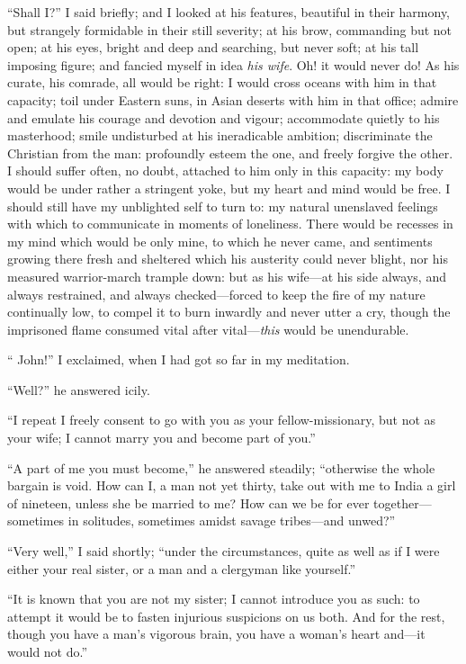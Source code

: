 \enquote{Shall I?} I said briefly; and I looked at his features,
beautiful in their harmony, but strangely formidable in their still
severity; at his brow, commanding but not open; at his eyes, bright and
deep and searching, but never soft; at his tall imposing figure; and
fancied myself in idea \emph{his wife}. Oh! it would never do! As his
curate, his comrade, all would be right: I would cross oceans with him
in that capacity; toil under Eastern suns, in Asian deserts with him in
that office; admire and emulate his courage and devotion and vigour;
accommodate quietly to his masterhood; smile undisturbed at his
ineradicable ambition; discriminate the Christian from the man:
profoundly esteem the one, and freely forgive the other. I should
suffer often, no doubt, attached to him only in this capacity: my body
would be under rather a stringent yoke, but my heart and mind would be
free. I should still have my unblighted self to turn to: my natural
unenslaved feelings with which to communicate in moments of loneliness. 
There would be recesses in my mind which would be only mine, to which he
never came, and sentiments growing there fresh and sheltered which his
austerity could never blight, nor his measured warrior-march trample
down: but as his wife---at his side always, and always restrained, and
always checked---forced to keep the fire of my nature continually low,
to compel it to burn inwardly and never utter a cry, though the
imprisoned flame consumed vital after vital---\emph{this} would be
unendurable.

\enquote{\St{} John!} I exclaimed, when I had got so far in my meditation.

\enquote{Well?} he answered icily.

\enquote{I repeat I freely consent to go with you as your
fellow-missionary, but not as your wife; I cannot marry you and become
part of you.}

\enquote{A part of me you must become,} he answered steadily;
\enquote{otherwise the whole bargain is void. How can I, a man not yet
thirty, take out with me to India a girl of nineteen, unless she be
married to me? How can we be for ever together---sometimes in
solitudes, sometimes amidst savage tribes---and unwed?}

\enquote{Very well,} I said shortly; \enquote{under the circumstances,
quite as well as if I were either your real sister, or a man and a
clergyman like yourself.}

\enquote{It is known that you are not my sister; I cannot introduce you
as such: to attempt it would be to fasten injurious suspicions on us
both. And for the rest, though you have a man's vigorous brain, you
have a woman's heart and---it would not do.}

